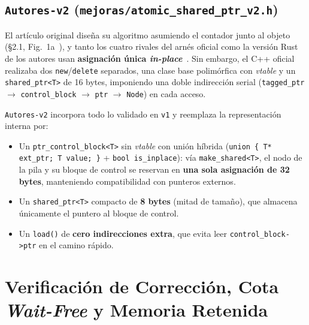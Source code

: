 \documentclass[11pt,a4paper]{article}
\begin{document}
\subsection{\texttt{Autores-v2} (\texttt{mejoras/atomic\_shared\_ptr\_v2.h})}
El artículo original diseña su algoritmo asumiendo el contador junto al objeto (\S 2.1, Fig.~1a~\cite{dewolff2024waitfree}), y tanto los cuatro rivales del arnés oficial como la versión Rust de los autores usan \textbf{asignación única \emph{in-place}}~\cite{dimov2007n2351,anderson2022turning}. Sin embargo, el C++ oficial realizaba dos \texttt{new}/\texttt{delete} separados, una clase base polimórfica con \emph{vtable} y un \texttt{shared\_ptr<T>} de 16 bytes, imponiendo una doble indirección serial (\texttt{tagged\_ptr} $\to$ \texttt{control\_block} $\to$ \texttt{ptr} $\to$ \texttt{Node}) en cada acceso.

\texttt{Autores-v2} incorpora todo lo validado en \texttt{v1} y reemplaza la representación interna por:
\begin{itemize}
  \item Un \texttt{ptr\_control\_block<T>} sin \emph{vtable} con unión híbrida (\texttt{union \{ T* ext\_ptr; T value; \}} + \texttt{bool is\_inplace}): vía \texttt{make\_shared<T>}, el nodo de la pila y su bloque de control se reservan en \textbf{una sola asignación de 32 bytes}, manteniendo compatibilidad con punteros externos.
  \item Un \texttt{shared\_ptr<T>} compacto de \textbf{8 bytes} (mitad de tamaño), que almacena únicamente el puntero al bloque de control.
  \item Un \texttt{load()} de \textbf{cero indirecciones extra}, que evita leer \texttt{control\_block->ptr} en el camino rápido.
\end{itemize}

\section{Verificación de Corrección, Cota \emph{Wait-Free} y Memoria Retenida}
\end{document}
